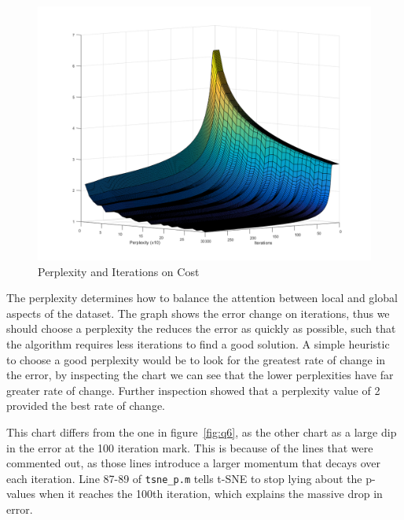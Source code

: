 \begin{figure}[H]
    \includegraphics[width=\linewidth]{../../pracs/week6/images/q8}
    \centering
    \caption{Perplexity and Iterations on Cost}
\end{figure}

The perplexity determines how to balance the attention between local and global aspects of the dataset.
The graph shows the error change on iterations, thus we should choose a perplexity the reduces the error as quickly as possible, such that the algorithm requires less iterations to find a good solution.
A simple heuristic to choose a good perplexity would be to look for the greatest rate of change in the error, by inspecting the chart we can see that the lower perplexities have far greater rate of change.
Further inspection showed that a perplexity value of 2 provided the best rate of change.

This chart differs from the one in figure~\ref{fig:q6}, as the other chart as a large dip in the error at the 100 iteration mark.
This is because of the lines that were commented out, as those lines introduce a larger momentum that decays over each iteration. Line 87-89 of \verb|tsne_p.m| tells t-SNE to stop lying about the p-values when it reaches the 100th iteration, which explains the massive drop in error.

